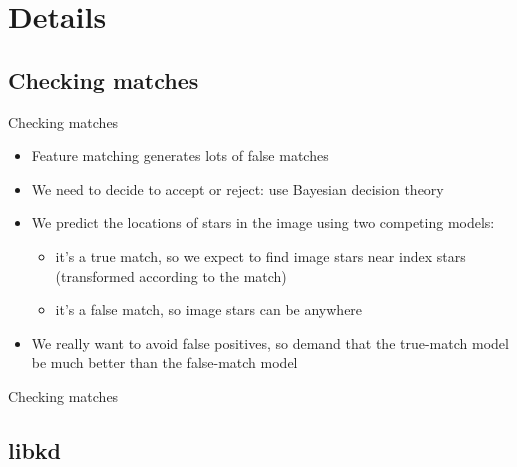 \documentclass[compress]{beamer}
\begin{document}
\section{Details}

\subsection{Checking matches}

\begin{frame}{Checking matches}
  \begin{itemize}
    \addtolength{\itemsep}{0.5ex}
    \item Feature matching generates lots of \alert{false matches}
    \item We need to \alert{decide} to accept or reject: use \alert{Bayesian decision theory}
    \item We \alert{predict} the locations of stars in the image using
      two competing models:
      \begin{itemize}
        \addtolength{\topsep}{0.5ex}
        \addtolength{\itemsep}{0.5ex}
      \item it's a true match, so we expect to find \alert{image}
        stars near \alert{index} stars (transformed according to the match)
      \item it's a false match, so image stars can be \alert{anywhere}
      \end{itemize}
    \item We really want to avoid false positives, so demand that the
      true-match model be \alert{much better} than the false-match
      model
  \end{itemize}
\end{frame}

\begin{frame}{Checking matches}
  \vspace{-10pt}
  \begin{center}
  \end{center}
\end{frame}

\subsection{libkd}
\end{document}
